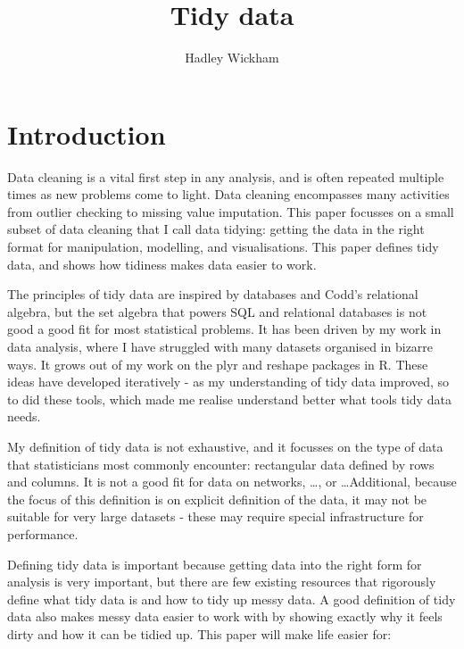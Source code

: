 \documentclass[oneside]{article}
\title{Tidy data}
\author{Hadley Wickham}
\begin{document}
\maketitle

\section{Introduction}

Data cleaning is a vital first step in any analysis, and is often repeated multiple times as new problems come to light. Data cleaning encompasses many activities from outlier checking to missing value imputation. This paper focusses on a small subset of data cleaning that I call data tidying: getting the data in the right format for  manipulation, modelling, and visualisations. This paper defines tidy data, and shows how tidiness makes data easier to work. 

%

The principles of tidy data are inspired by databases and Codd's relational algebra, but the set algebra that powers SQL and relational databases is not good a good fit for most statistical problems. It has been driven by my work in data analysis, where I have struggled with many datasets organised in bizarre ways. It grows out of my work on the plyr \citep{me:plyr} and reshape \citep{wickham:2007b} packages in R. These ideas have developed iteratively - as my understanding of tidy data improved, so to did these tools, which made me realise understand better what tools tidy data needs.

My definition of tidy data is not exhaustive, and it focusses on the type of data that statisticians most commonly encounter: rectangular data defined by rows and columns. It is not a good fit for data on networks, \ldots, or \ldots Additional, because the focus of this definition is on explicit definition of the data, it may not be suitable for very large datasets - these may require special infrastructure for performance.

Defining tidy data is important because getting data into the right form for analysis is very important, but there are few existing resources that rigorously define what tidy data is and how to tidy up messy data. A good definition of tidy data also makes messy data easier to work with by showing exactly why it feels dirty and how it can be tidied up. This paper will make life easier for:
\end{document}
